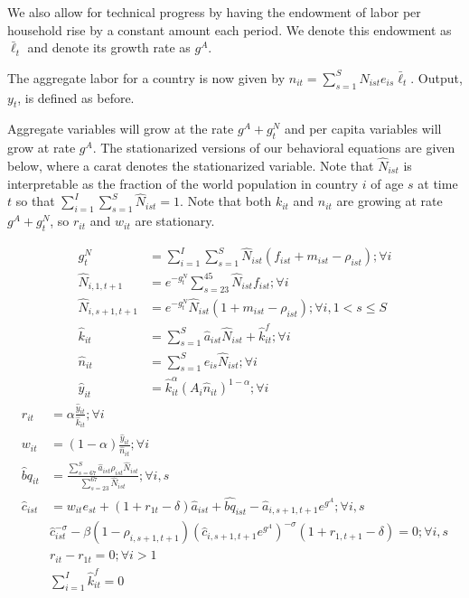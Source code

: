 \documentclass[letterpaper,12pt]{article}
\theoremstyle{definition}
\numberwithin{equation}{section}
\begin{document}
\begin{spacing}{1.5}
	We also allow for technical progress by having the endowment of labor per household rise by a constant amount each period.  We denote this endowment as $\bar \ell_t$ and denote its growth rate as $g^A$.

	The aggregate labor for a country is now given by $n_{it} = \sum_{s=1}^S N_{ist} e_{is} \bar \ell_t$.  Output, $y_t$, is defined as before. 

	Aggregate variables will grow at the rate $g^A+g^N_t$ and per capita variables will grow at rate $g^A$.  The stationarized versions of our behavioral equations are given below, where a carat denotes the stationarized variable.  Note that $\hat N_{ist}$ is interpretable as the fraction of the world population in country $i$ of age $s$ at time $t$ so that $\sum_{i=1}^I \sum_{s=1}^S \hat N_{ist} = 1$.  Note that both $k_{it}$ and $n_{it}$ are growing at rate $g^A+g^N_t$, so $r_{it}$ and $w_{it}$ are stationary.

	\begin{align}
		g^N_t & = \sum_{i=1}^I \sum_{s=1}^S \hat N_{ist} (f_{ist}+m_{ist}-\rho_{ist}) ; \forall i\\
		\hat N_{i,1,t+1} & = e^{-g^N_t}\sum_{s=23}^{45} \hat N_{ist} f_{ist} ; \forall i\\
		\hat N_{i,s+1,t+1} & = e^{-g^N_t}\hat N_{ist} (1+m_{ist}-\rho_{ist}); \forall i, 1<s\le S \\
		\hat k_{it} & = \sum_{s=1}^S \hat a_{ist} \hat N_{ist} + \hat k_{it}^f; \forall i \\
		\hat n_{it} & = \sum_{s=1}^S e_{is} \hat N_{ist}; \forall i \\
		\hat y_{it} & = \hat k_{it}^\alpha \left( A_{i} \hat n_{it} \right)^{1-\alpha} ; \forall i
	\end{align}
	\begin{align}
		r_{it} & = \alpha \frac{\hat y_{it}}{\hat k_{it}}; \forall i \\
		w_{it} & = (1-\alpha) \frac{\hat y_{it}}{\hat n_{it}}; \forall i \\
		\hat bq_{it} & = \frac{\sum_{s=67}^S \hat a_{ist} \rho_{ist} \hat N_{ist}}{\sum_{s=23}^{67} \hat N_{ist}} ; \forall i,s \\
	    \hat c_{ist} & = w_{it} e_{st} + (1+r_{1t}-\delta)\hat a_{ist} + \hat{bq}_{ist} - \hat a_{i,s+1,t+1}e^{g^A} ; \forall i,s \\
		& \hat c_{ist}^{-\sigma} - \beta (1-\rho_{i,s+1,t+1}) \left(\hat c_{i,s+1,t+1} e^{g^A}\right)^{-\sigma}(1+r_{1,t+1}-\delta) = 0; \forall i,s \\ 
		& r_{it} - r_{1t} = 0; \forall i>1 \\
		& \sum_{i=1}^I \hat k^f_{it} = 0
	\end{align}


\end{spacing}
\end{document}
